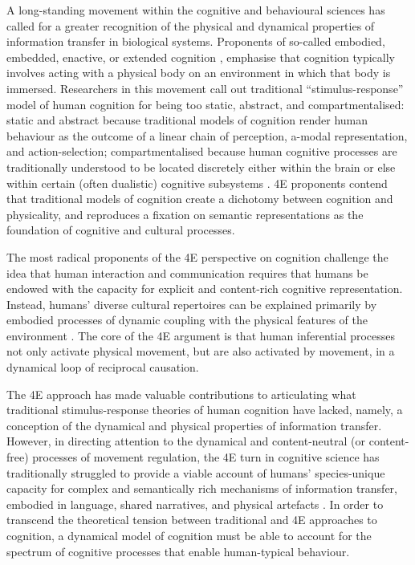 \begin{CJK}{UTF8}{gbsn}
A long-standing movement within the cognitive and behavioural sciences has called for a greater recognition of the physical and dynamical properties of information transfer in biological systems.  Proponents of so-called embodied, embedded, enactive, or extended cognition \citep[now collectively referred to as ``4E cognition,'' see][]{Menary2010}, emphasise that cognition typically involves acting with a physical body on an environment in which that body is immersed.  Researchers in this movement call out traditional ``stimulus-response'' model of human cognition for being too static, abstract, and compartmentalised: static and abstract because traditional models of cognition render human behaviour as the outcome of a linear chain of perception, a-modal representation, and action-selection; compartmentalised because human cognitive processes are traditionally understood to be located discretely either within the brain or else within certain (often dualistic) cognitive subsystems \citep[e.g., emotional and cognitive, System 1 (fast) and System 2 (slow), implicit and explicit, and so on; cf.][]{Diennes1999,Kahneman2011}.  4E proponents contend that traditional models of cognition create a dichotomy between cognition and physicality, and reproduces a fixation on semantic representations as the foundation of cognitive and cultural processes.

The most radical proponents of the 4E perspective on cognition challenge the idea that human interaction and communication requires that humans be endowed with the capacity for explicit and content-rich cognitive representation.  Instead, humans' diverse cultural repertoires can be explained primarily by embodied processes of dynamic coupling with the physical features of the environment \citep{Gallagher2001,Gallagher2008,Fuchs2009}.  The core of the 4E argument is that human inferential processes not only activate physical movement, but are also activated by movement, in a dynamical loop of reciprocal causation.

The 4E approach has made valuable contributions to articulating what traditional stimulus-response theories of human cognition have lacked, namely, a conception of the dynamical and physical properties of information transfer.  However, in directing attention to the dynamical and content-neutral (or content-free) processes of movement regulation, the 4E turn in cognitive science has traditionally struggled to provide a viable account of humans' species-unique capacity for complex and semantically rich mechanisms of information transfer, embodied in language, shared narratives, and physical artefacts \citep{Ramstead2016}.  In order to transcend the theoretical tension between traditional and 4E approaches to cognition, a dynamical model of cognition must be able to account for the spectrum of cognitive processes that enable human-typical behaviour.


\end{CJK}
